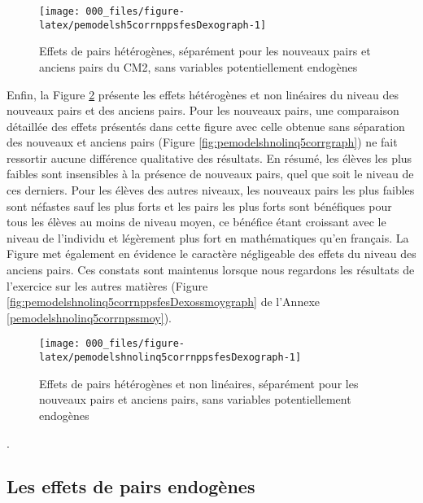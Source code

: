 \documentclass[
]{book}
\begin{document}
\begin{figure}[H]

{\centering \texttt{[image: 000\_files/figure-latex/pemodelsh5corrnppsfesDexograph-1]} 

}

\caption{Effets de pairs hétérogènes, séparément pour les nouveaux pairs et anciens pairs du CM2, sans variables potentiellement endogènes}\label{fig:pemodelsh5corrnppsfesDexograph}
\end{figure}

\quad Enfin, la Figure \ref{fig:pemodelshnolinq5corrnppsfesDexograph} présente les effets hétérogènes et non linéaires du niveau des nouveaux pairs et des anciens pairs. Pour les nouveaux pairs, une comparaison détaillée des effets présentés dans cette figure avec celle obtenue sans séparation des nouveaux et anciens pairs (Figure \ref{fig:pemodelshnolinq5corrgraph}) ne fait ressortir aucune différence qualitative des résultats. En résumé, les élèves les plus faibles sont insensibles à la présence de nouveaux pairs, quel que soit le niveau de ces derniers. Pour les élèves des autres niveaux, les nouveaux pairs les plus faibles sont néfastes sauf les plus forts et les pairs les plus forts sont bénéfiques pour tous les élèves au moins de niveau moyen, ce bénéfice étant croissant avec le niveau de l'individu et légèrement plus fort en mathématiques qu'en français. La Figure met également en évidence le caractère négligeable des effets du niveau des anciens pairs. Ces constats sont maintenus lorsque nous regardons les résultats de l'exercice sur les autres matières (Figure \ref{fig:pemodelshnolinq5corrnppsfesDexossmoygraph} de l'Annexe \ref{pemodelshnolinq5corrnpssmoy}).

\begin{figure}[H]

{\centering \texttt{[image: 000\_files/figure-latex/pemodelshnolinq5corrnppsfesDexograph-1]} 

}

\caption{Effets de pairs hétérogènes et non linéaires, séparément pour les nouveaux pairs et anciens pairs, sans variables potentiellement endogènes}\label{fig:pemodelshnolinq5corrnppsfesDexograph}
\end{figure}

.

\hypertarget{peresendo}{%
\subsection{Les effets de pairs endogènes}\label{peresendo}}
\end{document}
